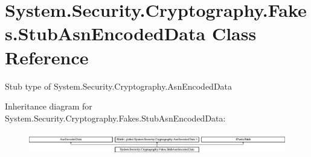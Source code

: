 \hypertarget{class_system_1_1_security_1_1_cryptography_1_1_fakes_1_1_stub_asn_encoded_data}{\section{System.\-Security.\-Cryptography.\-Fakes.\-Stub\-Asn\-Encoded\-Data Class Reference}
\label{class_system_1_1_security_1_1_cryptography_1_1_fakes_1_1_stub_asn_encoded_data}
}


Stub type of System.\-Security.\-Cryptography.\-Asn\-Encoded\-Data 


Inheritance diagram for System.\-Security.\-Cryptography.\-Fakes.\-Stub\-Asn\-Encoded\-Data\-:\begin{figure}[H]
\begin{center}
\leavevmode
\includegraphics[height=0.969697cm]{class_system_1_1_security_1_1_cryptography_1_1_fakes_1_1_stub_asn_encoded_data}
\end{center}
\end{figure}
